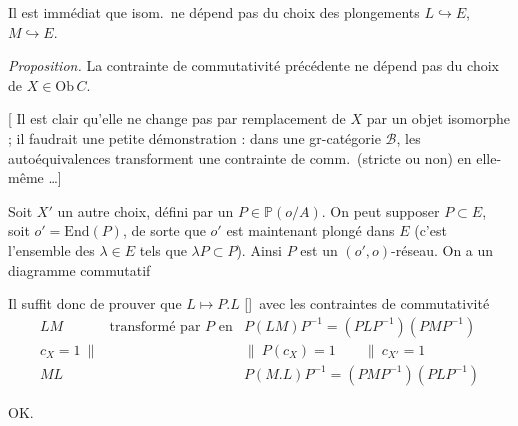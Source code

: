 \documentclass[11pt,a4paper]{article}
\begin{document}
Il est immédiat que  isom.\ ne dépend pas du choix
des plongements $L \hookrightarrow E$, $M \hookrightarrow E$.

\emph{Proposition.} La contrainte de commutativité précédente ne dépend
pas du choix de $X \in \mathrm{Ob}\, C$.

[ Il est clair qu'elle ne
change pas par remplacement de $X$ par un objet isomorphe ; il faudrait
une petite démonstration : dans une gr-catégorie $\mathcal{B}$, les
 autoéquivalences  transforment une
contrainte de comm.\ (stricte ou non) en elle-même …]

\struck{\ill{}} Soit $X'$ un autre choix, défini par un $P \in
\mathbb{P}(o/A)$. On peut supposer $P \subset E$, soit $o' =
\mathrm{End}(P)$, de sorte que $o'$ est maintenant plongé dans $E$ (c'est
l'ensemble des $\lambda \in E$ tels que $\lambda P \subset P$). Ainsi $P$
est un  $(o',o)$-réseau. On a un diagramme commutatif



Il suffit donc de prouver que $L \mapsto P.L$ \struck{\ill{}}
[]\ avec les \ill{} contraintes de commutativité
\[
  \begin{array}{ccc}
    LM & \text{transformé par } P \text{ en} &
    P(LM)P^{-1} = (PLP^{-1})(PMP^{-1}) \\
    c_{X} = 1 \ \| & & \| \ P(c_{X}) = 1 \qquad \| \ c_{X'} = 1 \\
    ML & & P(M.L)P^{-1} = (PMP^{-1})(PLP^{-1})
  \end{array}
\]

OK.

\end{document}
